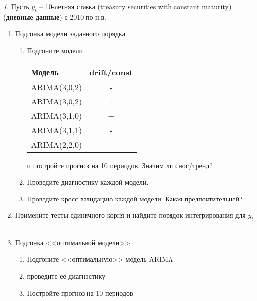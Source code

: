 \documentclass[12pt]{article}
\theoremstyle{remark}
\newtheorem{exercise}{}[subsection]
\begin{document}
\begin{exercise}
Пусть \(y_t\) -- 10-летняя ставка (treasury securities  with constant maturity) 
(\textbf{дневные данные}) с 2010 по н.в.
\begin{enumerate}
	\item Подгонка модели заданного порядка
	\begin{enumerate}
		\item Подгоните модели
		\begin{center}
		\begin{tabular}{l|c}
			Модель & drift/const \\ \hline
			ARIMA(3,0,2) & - \\
			ARIMA(3,0,2) & + \\
			ARIMA(3,1,0) & + \\
			ARIMA(3,1,1) & - \\
			ARIMA(2,2,0) & - \\ \hline
		\end{tabular}
		\end{center} 
		и постройте прогноз на 10 периодов. Значим ли снос/тренд?
		\item Проведите диагностику каждой модели.
		\item Проведите кросс-валидацию каждой модели. Какая предпочтительней?
	\end{enumerate}
	\item Примените тесты единичного корня и найдите порядок интегрирования для \(y_t\). 
	\item Подгонка <<оптимальной модели>>
	\begin{enumerate}
		\item Подгоните <<оптимальную>> модель ARIMA
		\item проведите её диагностику
		\item Постройте прогноз на 10 периодов
	\end{enumerate}
\end{enumerate}
\end{exercise}
\end{document}
